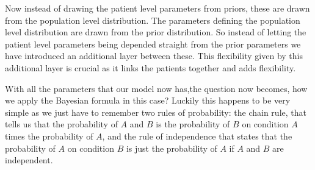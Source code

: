 \documentclass[12pt,a4paper,leqno]{report}
\theoremstyle{plain}
\theoremstyle{definition}
\theoremstyle{remark}
\begin{document}

\bigskip

Now instead of drawing the patient level parameters from priors, these are drawn from
the population level distribution. The parameters defining the population level
distribution are drawn from the prior distribution. So instead of letting the patient
level parameters being depended straight from the prior parameters we have introduced an
additional layer between these. This flexibility given by this additional layer is
crucial as it links the patients together and adds flexibility.


With all the parameters that our model now has,the question now becomes, how we apply
the Bayesian formula in this case? Luckily this happens to be very simple as we just
have to remember two rules of probability: the chain rule, that
tells us that the probability of $A$ and $B$ is the probability of $B$ on condition $A$
times the probability of $A$, and the rule of independence that states that the
probability of $A$ on condition $B$ is just the probability of $A$ if $A$ and $B$ are independent.
\end{document}
